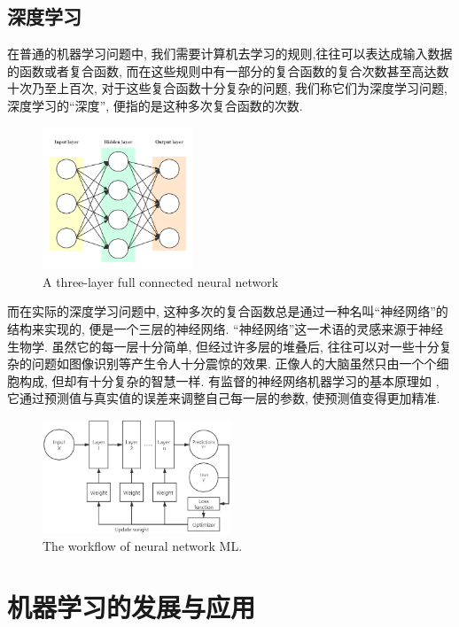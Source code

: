 \documentclass[lang=cn,11pt,a4paper]{elegantpaper}
\begin{document}
\subsection{深度学习}
\par 在普通的机器学习问题中, 我们需要计算机去学习的规则,往往可以表达成输入数据的函数或者复合函数, 而在这些规则中有一部分的复合函数的复合次数甚至高达数十次乃至上百次, 对于这些复合函数十分复杂的问题, 我们称它们为深度学习问题, 深度学习的“深度”, 便指的是这种多次复合函数的次数. 
\begin{figure}[htbp]
	\centering
	\includegraphics[width=0.4\textwidth]{DNN}
  	\caption{A three-layer full connected neural network\label{fig:DNN}}
\end{figure}
\par 而在实际的深度学习问题中, 这种多次的复合函数总是通过一种名叫“神经网络”的结构来实现的,  便是一个三层的神经网络. “神经网络”这一术语的灵感来源于神经生物学. 虽然它的每一层十分简单, 但经过许多层的堆叠后, 往往可以对一些十分复杂的问题如图像识别等产生令人十分震惊的效果. 正像人的大脑虽然只由一个个细胞构成, 但却有十分复杂的智慧一样. 有监督的神经网络机器学习的基本原理如 , 它通过预测值与真实值的误差来调整自己每一层的参数, 使预测值变得更加精准.
\begin{figure}[htbp]
	\centering
	\hspace{-30pt}\includegraphics[width=0.5\textwidth]{Net}
  	\caption{The workflow of neural network ML.\label{fig:net}}
\end{figure}
\section{机器学习的发展与应用}
\end{document}
